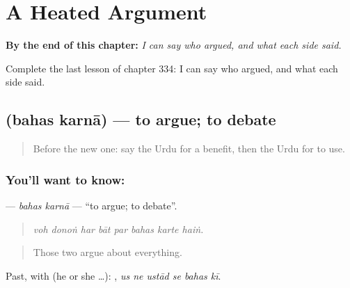 
\chapter{A Heated Argument}
\label{ch:ur-a-heated-argument}

\begin{chapteropening}
\textbf{By the end of this chapter:} \emph{I can say who argued, and what each side said.}

Complete the last lesson of chapter 334: I can say who argued, and what each side said.
\end{chapteropening}

\section[\texorpdfstring{\ur{بحث} \ur{کرنا} (bahas karnā)}{بحث کرنا (bahas karnā)}]{  (bahas karnā) — to argue; to debate}

\label{lesson:UR-C334-bahas-karna}



\begin{quote}
Before the new one: say the Urdu for a benefit, then the Urdu for to use.
\end{quote}

\subsection*{You'll want to know:  }
\textbf{ } — \emph{bahas karnā} — \textquotedblleft{}to argue; to debate\textquotedblright{}.

\begin{quote}
       
\end{quote}

\begin{quote}
\emph{voh donoṅ har bāt par bahas karte haiṅ.}
\end{quote}

\begin{quote}
Those two argue about everything.
\end{quote}

Past, with  (he or she …):      , \emph{us ne ustād se bahas kī}.

